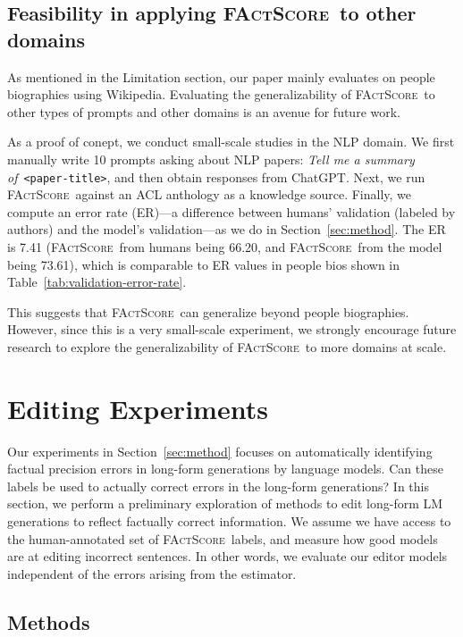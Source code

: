 \documentclass[11pt]{article}
\newcommand{\ours}{\textsc{FActScore}}
\begin{document}
\subsection{Feasibility in applying \ours\ to other domains}\label{app:nlp-domain}
As mentioned in the Limitation section, our paper mainly evaluates on people biographies using Wikipedia. Evaluating the generalizability of \ours\ to other types of prompts and other domains is an avenue for future work.

As a proof of conept, we conduct small-scale studies in the NLP domain. We first manually write 10 prompts asking about NLP papers: \emph{Tell me a summary of}~\texttt{<paper-title>}, and then obtain responses from ChatGPT. Next, we run \ours\ against an ACL anthology as a knowledge source. Finally, we compute an error rate (ER)---a difference between humans’ validation (labeled by authors) and the model’s validation---as we do in Section~\ref{sec:method}. The ER is 7.41 (\ours\ from humans being 66.20, and \ours\ from the model being 73.61), which is comparable to ER values in people bios shown in Table~\ref{tab:validation-error-rate}. 

This suggests that \ours\ can generalize beyond people biographies. However, since this is a very small-scale experiment, we strongly encourage future research to explore the generalizability of \ours\ to more domains at scale.



\section{Editing Experiments}\label{sec:editing}

Our experiments in Section~\ref{sec:method} focuses on automatically identifying factual precision errors in long-form generations by language models. Can these labels be used to actually correct errors in the long-form generations? In this section, we perform a preliminary exploration of methods to edit long-form LM generations to reflect factually correct information. We assume we have access to the human-annotated set of \ours\ labels, and measure how good models are at editing incorrect sentences. In other words, we evaluate our editor models independent of the errors arising from the estimator. %

\subsection{Methods}\label{subsubsec:editing-methods}
\end{document}
